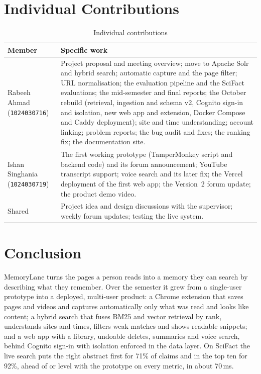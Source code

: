 \section{Individual Contributions}

\begin{table}[H]
\centering
\footnotesize
\begin{tabularx}{\textwidth}{>{\raggedright\arraybackslash}p{} L}
\toprule
\textbf{Member} & \textbf{Specific work} \\
\midrule
Rabeeh Ahmad (\texttt{1024030716}) & Project proposal and meeting overview; move to Apache Solr and hybrid search; automatic capture and the page filter; URL normalisation; the evaluation pipeline and the SciFact evaluations; the mid-semester and final reports; the October rebuild (retrieval, ingestion and schema v2, Cognito sign-in and isolation, new web app and extension, Docker Compose and Caddy deployment); site and time understanding; account linking; problem reports; the bug audit and fixes; the ranking fix; the documentation site. \\
Ishan Singhania (\texttt{1024030719}) & The first working prototype (TamperMonkey script and backend code) and its forum announcement; YouTube transcript support; voice search and its later fix; the Vercel deployment of the first web app; the Version~2 forum update; the product demo video. \\
Shared & Project idea and design discussions with the supervisor; weekly forum updates; testing the live system. \\
\bottomrule
\end{tabularx}
\caption{Individual contributions}
\label{tab:contributions}
\end{table}

\section{Conclusion}

MemoryLane turns the pages a person reads into a memory they can search by
describing what they remember. Over the semester it grew from a single-user
prototype into a deployed, multi-user product: a Chrome extension that saves
pages and videos and captures automatically only what was read and looks like
content; a hybrid search that fuses BM25 and vector retrieval by rank,
understands sites and times, filters weak matches and shows readable snippets;
and a web app with a library, undoable deletes, summaries and voice search,
behind Cognito sign-in with isolation enforced in the data layer. On SciFact
the live search puts the right abstract first for 71\% of claims and in the
top ten for 92\%, ahead of or level with the prototype on every metric, in about 70\,ms.

